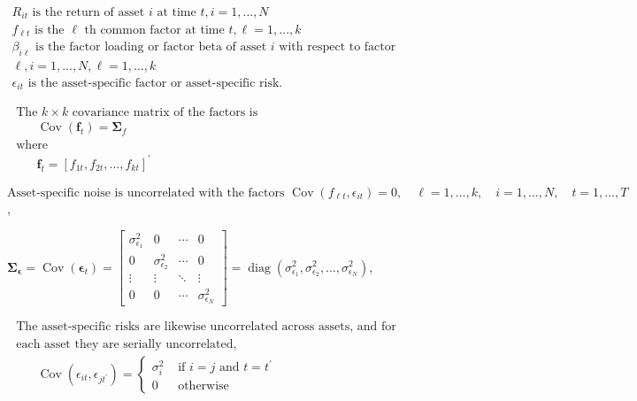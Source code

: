 \documentclass[11pt]{article}
\begin{document}
\(\begin{array}{l}{R_{i t} \text { is the return of asset } i \text { at time } t, i=1, \ldots, N} \\ {f_{\ell t} \text { is the } \ell \text { th common factor at time } t, \ell=1, \ldots, k} \\ {\beta_{i \ell} \text { is the factor loading or factor beta of asset } i \text { with respect to factor }} \\ {\ell, i=1, \ldots, N, \ell=1, \ldots, k} \\ {\epsilon_{i t} \text { is the asset-specific factor or asset-specific risk. }}\end{array}\)

\(\begin{array}{l}{\text { The } k \times k \text { covariance matrix of the factors is }} \\ {\qquad \operatorname{Cov}\left(\boldsymbol{f}_{t}\right)=\boldsymbol{\Sigma}_{f}} \\ {\text { where }} \\ {\qquad \boldsymbol{f}_{t}=\left[f_{1 t}, f_{2 t}, \ldots, f_{k t}\right]^{\prime}}\end{array}\)

\(\text {Asset-specific noise is uncorrelated with the factors } \operatorname{Cov}\left(f_{\ell t}, \epsilon_{i t}\right)=0, \quad \ell=1, \ldots, k, \quad i=1, \ldots, N, \quad t=1, \ldots, T\),

\(\boldsymbol{\Sigma}_{\boldsymbol{\epsilon}}=\operatorname{Cov}\left(\boldsymbol{\epsilon}_{t}\right)=\left[\begin{array}{cccc}{\sigma_{\epsilon_{1}}^{2}} & {0} & {\cdots} & {0} \\ {0} & {\sigma_{\epsilon_{2}}^{2}} & {\cdots} & {0} \\ {\vdots} & {\vdots} & {\ddots} & {\vdots} \\ {0} & {0} & {\cdots} & {\sigma_{\epsilon_{N}}^{2}}\end{array}\right]=\operatorname{diag}\left(\sigma_{\epsilon_{1}}^{2}, \sigma_{\epsilon_{2}}^{2}, \ldots, \sigma_{\epsilon_{N}}^{2}\right)\),

\(\begin{array}{l}{\text { The asset-specific risks are likewise uncorrelated across assets, and for }} \\ {\text { each asset they are serially uncorrelated, }} \\ {\qquad \operatorname{Cov}\left(\epsilon_{i t}, \epsilon_{j t^{\prime}}\right)=\left\{\begin{array}{ll}{\sigma_{i}^{2}} & {\text { if } i=j \text { and } t=t^{\prime}} \\ {0} & {\text { otherwise }}\end{array}\right.}\end{array}\)
\end{document}
